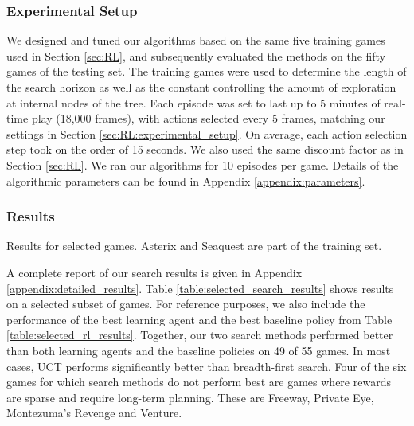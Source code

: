 \documentclass[twoside,11pt]{article}
\newcommand{\gamename}[1]{{\sc #1}}
\begin{document}
\subsubsection{Experimental Setup}
\label{sec:exp}

We designed and tuned our algorithms based on the same five training games used in Section \ref{sec:RL}, and subsequently evaluated the methods on the fifty games of the testing set. 
The training games were used to determine the length of the search horizon as well as the constant controlling the amount of exploration at internal nodes of the tree. 
Each episode was set to last up to 5 minutes of real-time play (18,000 frames), with actions selected every 5 frames, matching our settings in Section \ref{sec:RL:experimental_setup}. On average, each action selection step took on the order of 15 seconds. 
We also used the same discount factor as in Section \ref{sec:RL}.
We ran our algorithms for 10 episodes per game.  Details of the algorithmic parameters can be found in Appendix \ref{appendix:parameters}.

\subsubsection{Results}\label{sec:planning:results}

\begin{table}
\small
\begin{center}

\end{center}
\vspace{-1.6em}
\caption{Results for selected games. \gamename{Asterix} and \gamename{Seaquest} are part of the training set.\label{table:selected_search_results}}
\end{table}


A complete report of our search results is given in Appendix \ref{appendix:detailed_results}.
Table \ref{table:selected_search_results} shows results on a selected subset of games.
For reference purposes, we also include the performance of the best learning agent and the best 
baseline policy from Table \ref{table:selected_rl_results}.
Together, our two search methods performed better than both learning agents and the baseline policies on 49 of 55 games. In most cases, UCT performs significantly better than breadth-first search.
Four of the six games for which search methods do not perform best are games where rewards are sparse and require long-term planning. These are \gamename{Freeway}, \gamename{Private Eye}, \gamename{Montezuma's Revenge} and \gamename{Venture}. 
\end{document}
